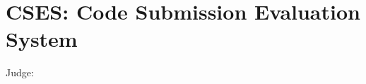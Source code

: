 \documentclass[../../main.tex]{subfiles}
\begin{document}
\chapter{CSES: Code Submission Evaluation System}
Judge: 
\end{document}

